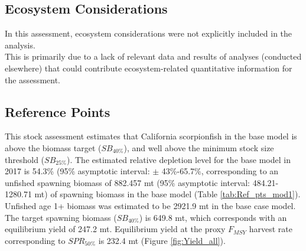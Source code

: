 \documentclass[12pt,]{article}
\begin{document}
\FloatBarrier

\subsection*{Ecosystem Considerations}\label{ecosystem-considerations}

In this assessment, ecosystem considerations were not explicitly
included in the analysis.\\
This is primarily due to a lack of relevant data and results of analyses
(conducted elsewhere) that could contribute ecosystem-related
quantitative information for the assessment.

\subsection*{Reference Points}\label{reference-points}

This stock assessment estimates that California scorpionfish in the base
model is above the biomass target (\(SB_{40\%}\)), and well above the
minimum stock size threshold (\(SB_{25\%}\)). The estimated relative
depletion level for the base model in 2017 is 54.3\% (95\% asymptotic
interval: \(\pm\) 43\%-65.7\%, corresponding to an unfished spawning
biomass of 882.457 mt (95\% asymptotic interval: 484.21-1280.71 mt) of
spawning biomass in the base model (Table \ref{tab:Ref_pts_mod1}).
Unfished age 1+ biomass was estimated to be 2921.9 mt in the base case
model. The target spawning biomass (\(SB_{40\%}\)) is 649.8 mt, which
corresponds with an equilibrium yield of 247.2 mt. Equilibrium yield at
the proxy \(F_{MSY}\) harvest rate corresponding to \(SPR_{50\%}\) is
232.4 mt (Figure \ref{fig:Yield_all}).

\FloatBarrier
\end{document}
